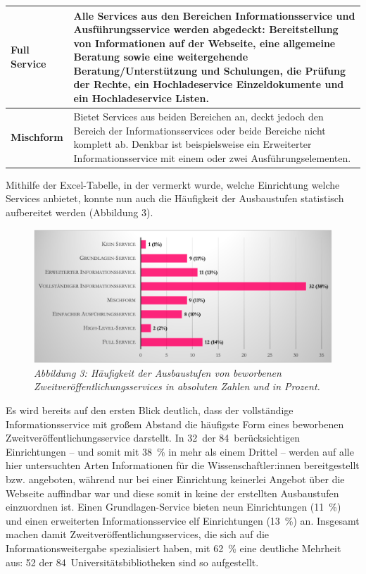 \documentclass[a4paper,
fontsize=11pt,
oneside,
numbers=noperiodatend,
parskip=half-,
bibliography=totoc,
final
]{scrartcl}
\begin{document}
\begin{table}[h!]
\begin{tabular}{lp{9cm}}
    Full Service                                 & Alle Services aus den Bereichen Informationsservice und Ausführungsservice werden abgedeckt: Bereitstellung von Informationen auf der Webseite, eine allgemeine Beratung sowie eine weitergehende Beratung/Unterstützung und Schulungen, die Prüfung der Rechte, ein Hochladeservice Einzeldokumente und ein Hochladeservice Listen.                           \\
    \midrule
    \textbf{Mischform}                                  & Bietet Services aus beiden Bereichen an, deckt jedoch den Bereich der Informationsservices oder beide Bereiche nicht komplett ab. Denkbar ist beispielsweise ein Erweiterter Informationsservice mit einem oder zwei Ausführungselementen.  \\                                                                                                                                                                                                                                                                                                                                                    \bottomrule
    \end{tabular}
\end{table}

Mithilfe der Excel-Tabelle, in der vermerkt wurde, welche Einrichtung
welche Services anbietet, konnte nun auch die Häufigkeit der
Ausbaustufen statistisch aufbereitet werden (Abbildung 3).

\begin{figure}[h!]
\centering
\includegraphics[width=.9\textwidth]{img/abb3.png}
\caption{\textit{Abbildung 3: Häufigkeit der Ausbaustufen von beworbenen
Zweitveröffentlichungsservices in absoluten Zahlen und in Prozent.}}
\end{figure}

Es wird bereits auf den ersten Blick deutlich, dass der vollständige
Informationsservice mit großem Abstand die häufigste Form eines
beworbenen Zweitveröffentlichungsservice darstellt. In 32~der
84~berücksichtigen Einrichtungen -- und somit mit 38~\% in mehr als
einem Drittel -- werden auf alle hier untersuchten Arten Informationen
für die Wissenschaftler:innen bereitgestellt bzw. angeboten, während nur
bei einer Einrichtung keinerlei Angebot über die Webseite auffindbar war
und diese somit in keine der erstellten Ausbaustufen einzuordnen ist.
Einen Grundlagen-Service bieten neun Einrichtungen (11~\%) und einen
erweiterten Informationsservice elf Einrichtungen (13~\%) an. Insgesamt
machen damit Zweitveröffentlichungsservices, die sich auf die
Informationsweitergabe spezialisiert haben, mit 62~\% eine deutliche
Mehrheit aus: 52 der 84~Universitätsbibliotheken sind so aufgestellt.
\end{document}

